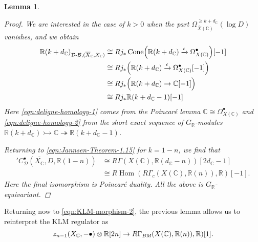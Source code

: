 \documentclass[10pt,a4paper,oneside]{article}
\DeclareMathOperator{\Cone}{Cone}
\DeclareMathOperator{\Hom}{Hom}
\newcommand{\CC}{\mathbb{C}}
\newcommand{\RR}{\mathbb{R}}
\newcommand{\BM}{\text{\it BM}}
\newcommand{\DB}{{\mathcal{D}\text{-}\mathcal{B}}}
\newcommand{\RHom}{R\!\Hom}
\theoremstyle{myplain}
\newtheorem{lemma}[theorem]{Lemma}
\theoremstyle{mydefinition}
\numberwithin{equation}{section}
\begin{document}
\begin{lemma}
\begin{proof}
    We are interested in the case of $k > 0$ when the part
    $\Omega^{\geqslant k + d_\CC}_{\overline{X} (\CC)} (\log D)$ vanishes, and
    we obtain
    \begin{align}
      \notag \RR (k + d_\CC)_{\DB, (\overline{X}_\CC,X_\CC)} & \cong
                                     R j_* \Cone \Bigl(\RR (k + d_\CC)
                                     \xrightarrow{\epsilon}
                                     \Omega_{X (\CC)}^\bullet \Bigr) [-1] \\
      \notag & \cong R j_* \Bigl(\RR (k + d_\CC) \xrightarrow{\epsilon}
               \Omega_{X (\CC)}^\bullet [-1] \Bigr) \\
      \label{eqn:deligne-homology-1} & \cong R j_* \Bigl(\RR (k + d_\CC) \to \CC [-1] \Bigr) \\
      \label{eqn:deligne-homology-2} & \cong R j_* \RR (k + d_\CC - 1) [-1]
    \end{align}
    Here \eqref{eqn:deligne-homology-1} comes from the Poincar\'{e} lemma
    $\CC \cong \Omega_{X (\CC)}^\bullet$ and \eqref{eqn:deligne-homology-2}
    from the short exact sequence of $G_\RR$-modules
    $\RR (k + d_\CC) \rightarrowtail \CC \twoheadrightarrow \RR (k + d_\CC - 1)$.

    Returning to \eqref{eqn:Jannsen-Theorem-1.15} for $k = 1-n$, we find that
    \begin{align*}
      {}' C^\bullet_\mathcal{D} (\overline{X_\CC}, D, \RR (1-n)) & \cong
      R\Gamma (X (\CC), \RR (d_\CC - n)) [2d_\CC-1] \\
      & \cong \RHom (R\Gamma_c (X (\CC), \RR (n)), \RR) [-1].
    \end{align*}
    Here the final isomorphism is Poincar\'{e} duality.
    All the above is $G_\RR$-equivariant.
  \end{proof}
\end{lemma}

Returning now to \eqref{eqn:KLM-morphism-2}, the previous lemma allows us to
reinterpret the KLM regulator as
\begin{equation}
  \label{eqn:KLM-morphism-3}
  z_{n-1} (X_\CC, -\bullet) \otimes \RR [2n] \to
  R\Gamma_\BM (X (\CC), \RR (n)), \RR) [1].
\end{equation}
\end{document}
